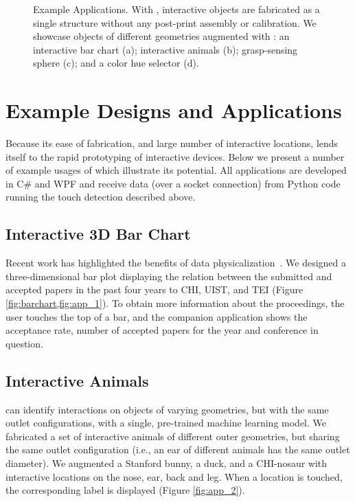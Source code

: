 			\begin{figure*}[h]
				\centering
				 \hfill
				\caption{Example \at Applications. With \at, interactive objects are
					fabricated as a single structure without any post-print assembly or
					calibration. We showcase objects of different geometries augmented with
					\at: an interactive bar chart (a); interactive animals (b);
					grasp-sensing sphere (c); and a color hue selector (d).}
				\label{fig:apps}
			\end{figure*}

	\section{Example Designs and Applications}
		Because its ease of fabrication, and large number of interactive locations,
		\at lends itself to the rapid prototyping of interactive devices. Below we
		present a number of example usages of \at which illustrate its potential.
		All applications are developed in C\# and WPF and receive data (over a
		socket connection) from Python code running the touch detection described
		above.
		
		\subsection{Interactive 3D Bar Chart}
			Recent work has highlighted the benefits of data
			physicalization~\cite{Jansen:2015cu}. We designed a three-dimensional bar
			plot displaying the relation between the submitted and accepted papers in
			the past four years to CHI, UIST, and TEI (Figure
			\ref{fig:barchart,fig:app_1}).  To obtain more information about the
			proceedings, the user touches the top of a bar, and the companion
			application shows the acceptance rate, number of accepted papers for the
			year and conference in question.
		    
		\subsection{Interactive Animals}
			\at can identify interactions on objects of varying geometries, but with
			the same outlet configurations, with a single, pre-trained machine
			learning model. We fabricated a set of interactive animals of different
			outer geometries, but sharing the same outlet configuration (i.e., an
			ear of different animals has the same outlet diameter). We augmented a
			Stanford bunny, a duck, and a CHI-nosaur with interactive locations on
			the nose, ear, back and leg. When a location is touched, the
			corresponding label is displayed (Figure \ref{fig:app_2}).
		    
